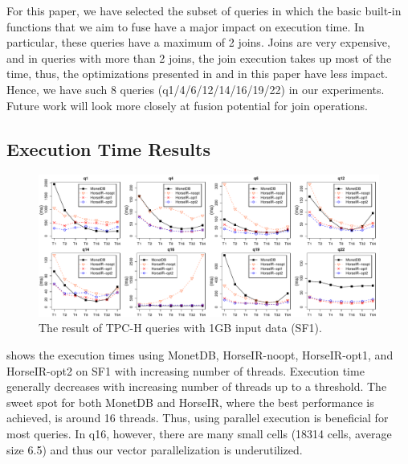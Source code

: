 For this paper, we have selected the subset of queries in which the basic built-in
functions that we aim to fuse have a major impact on execution time.
In particular, these queries have a maximum of 2 joins. Joins are very
expensive, and in queries with more than 2 joins, the join execution takes up
most of the time, thus, the optimizations presented in \OldPaper and in this
paper have less impact.
Hence, we have such 8 queries (q1/4/6/12/14/16/19/22) in our experiments.
Future work will look more closely at fusion potential for join operations.  



\subsection{Execution Time Results}

\begin{figure}[htbp]
\centering
\includegraphics[width=.95\textwidth]{./src/figure/sf1-v2.pdf}
\caption{The result of TPC-H queries with 1GB input data (SF1).}
\label{fig:tpch_result}
\end{figure}


 shows the execution times using MonetDB, HorseIR-noopt,
HorseIR-opt1, and HorseIR-opt2 on SF1 with increasing number of threads. 
Execution time generally decreases with increasing number of threads up to a threshold.
The sweet spot for both MonetDB and HorseIR, where the best
performance is achieved, is around 16 threads. Thus, using parallel execution is
beneficial for most queries. In q16, however, there are many small cells (18314 cells,
average size 6.5) and thus our vector parallelization is underutilized.

